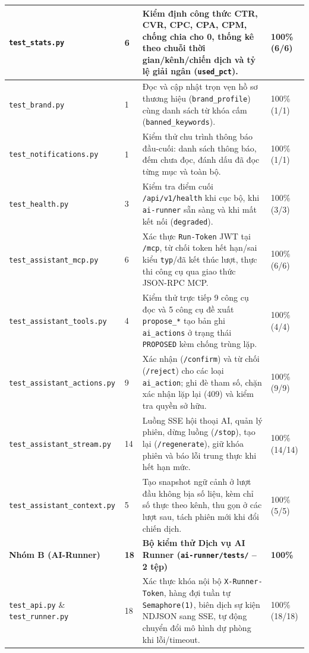 \begin{small}
\begin{longtable}{|L{4.3cm}|C{1.4cm}|L{6.1cm}|C{1.9cm}|}
\hline
\texttt{test\_stats.py} & 6 & Kiểm định công thức CTR, CVR, CPC, CPA, CPM, chống chia cho 0, thống kê theo chuỗi thời gian/kênh/chiến dịch và tỷ lệ giải ngân (\texttt{used\_pct}). & 100\% (6/6)\\
\hline
\texttt{test\_brand.py} & 1 & Đọc và cập nhật trọn vẹn hồ sơ thương hiệu (\texttt{brand\_profile}) cùng danh sách từ khóa cấm (\texttt{banned\_keywords}). & 100\% (1/1)\\
\hline
\texttt{test\_notifications.py} & 1 & Kiểm thử chu trình thông báo đầu-cuối: danh sách thông báo, đếm chưa đọc, đánh dấu đã đọc từng mục và toàn bộ. & 100\% (1/1)\\
\hline
\texttt{test\_health.py} & 3 & Kiểm tra điểm cuối \texttt{/api/v1/health} khi cục bộ, khi \texttt{ai-runner} sẵn sàng và khi mất kết nối (\texttt{degraded}). & 100\% (3/3)\\
\hline
\texttt{test\_assistant\_mcp.py} & 6 & Xác thực \texttt{Run-Token} JWT tại \texttt{/mcp}, từ chối token hết hạn/sai kiểu \texttt{typ}/đã kết thúc lượt, thực thi công cụ qua giao thức JSON-RPC MCP. & 100\% (6/6)\\
\hline
\texttt{test\_assistant\_tools.py} & 4 & Kiểm thử trực tiếp 9 công cụ đọc và 5 công cụ đề xuất \texttt{propose\_*} tạo bản ghi \texttt{ai\_actions} ở trạng thái \texttt{PROPOSED} kèm chống trùng lặp. & 100\% (4/4)\\
\hline
\texttt{test\_assistant\_}\allowbreak\texttt{actions.py} & 9 & Xác nhận (\texttt{/confirm}) và từ chối (\texttt{/reject}) cho các loại \texttt{ai\_action}; ghi đè tham số, chặn xác nhận lặp lại (409) và kiểm tra quyền sở hữu. & 100\% (9/9)\\
\hline
\texttt{test\_assistant\_}\allowbreak\texttt{stream.py} & 14 & Luồng SSE hội thoại AI, quản lý phiên, dừng luồng (\texttt{/stop}), tạo lại (\texttt{/regenerate}), giữ khóa phiên và báo lỗi trung thực khi hết hạn mức. & 100\% (14/14)\\
\hline
\texttt{test\_assistant\_}\allowbreak\texttt{context.py} & 5 & Tạo snapshot ngữ cảnh ở lượt đầu không bịa số liệu, kèm chỉ số thực theo kênh, thu gọn ở các lượt sau, tách phiên mới khi đổi chiến dịch. & 100\% (5/5)\\
\hline
\textbf{Nhóm B (AI-Runner)} & \textbf{18} & \textbf{Bộ kiểm thử Dịch vụ AI Runner (\texttt{ai-runner/tests/} -- 2 tệp)} & \textbf{100\%}\\
\hline
\texttt{test\_api.py} \& \texttt{test\_runner.py} & 18 & Xác thực khóa nội bộ \texttt{X-Runner-Token}, hàng đợi tuần tự \texttt{Semaphore(1)}, biên dịch sự kiện NDJSON sang SSE, tự động chuyển đổi mô hình dự phòng khi lỗi/timeout. & 100\% (18/18)\\

\end{longtable}
\end{small}
